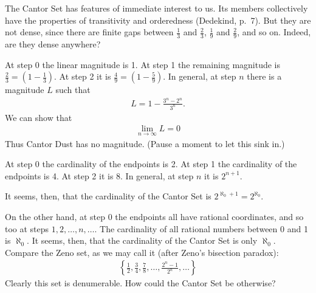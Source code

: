 \documentclass[twoside,openright]{article}
\begin{document}
\begin{enumerate}
\begin{enumerate}[A.]
    The Cantor Set has features of immediate interest to us. Its
    members collectively have the properties of transitivity and
    orderedness (Dedekind, p.~7). But they are not dense, since there
    are finite gaps between $\frac{1}{3}$ and $\frac{2}{3}$,
    $\frac{1}{9}$ and $\frac{2}{9}$, and so on. Indeed, are they dense
    anywhere?

    At step 0 the linear magnitude is 1. At step 1 the remaining
    magnitude is $\frac{2}{3}=(1-\frac{1}{3})$. At step 2 it is
    $\frac{4}{9}=(1-\frac{5}{9})$. In general, at step $n$ there is a
    magnitude $L$ such that
    \begin{align*}
      L=1-\frac{3^n-2^n}{3^n}.
    \end{align*}
    We can show that
    \begin{align*}
      \lim_{n\to\infty}L=0
    \end{align*}
    Thus Cantor Dust has no magnitude. (Pause a moment to let this
    sink in.)\label{CantorDust}

    At step 0 the cardinality of the endpoints is 2. At step 1 the
    cardinality of the endpoints is 4. At step 2 it is 8. In general,
    at step $n$ it is $2^{n+1}$.

    It seems, then, that the cardinality of the Cantor Set is
    $2^{\aleph_0+1}=2^{\aleph_0}$.

    On the other hand, at step 0 the endpoints all have rational
    coordinates, and so too at steps $1, 2, \dotsc, n, \dotsc$. The
    cardinality of all rational numbers between 0 and 1 is
    $\aleph_0$. It seems, then, that the cardinality of the Cantor Set
    is only $\aleph_0$. Compare the Zeno set, as we may call it (after
    Zeno's bisection paradox):
    \begin{align*}
      \left\{\frac{1}{2}, \frac{3}{4}, \frac{7}{8}, \dotsc, \frac{2^n-1}{2^n}, \dotsc\right\}
    \end{align*}
    Clearly this set is denumerable. How could the Cantor Set be
    otherwise?


\end{enumerate}
\end{enumerate}
\end{document}
